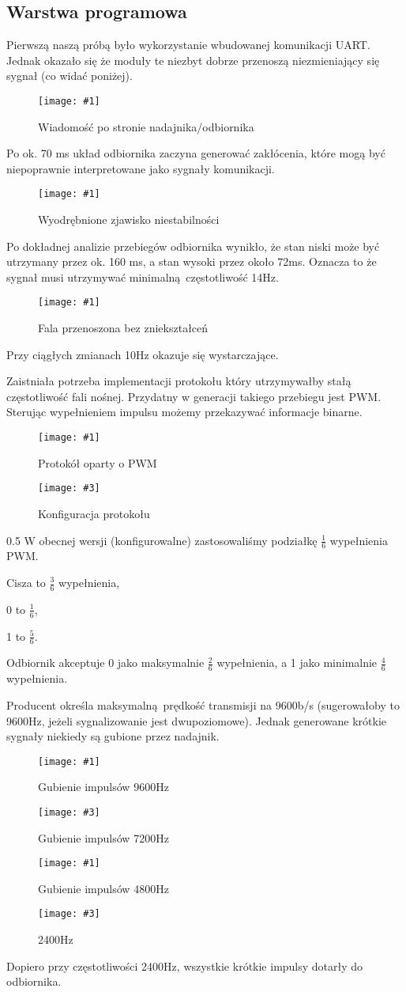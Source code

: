 \documentclass[12pt]{article}
\let\tempone\itemize
\let\temptwo\enditemize
\renewenvironment{itemize}{\tempone\setlength{\itemsep}{0cm}}{\temptwo}
\newcommand{\imgcustomsize}[3]{
	\begin{figure}[H]
		\centering
		\texttt{[image: \#1]}
		\caption{#2}
	\end{figure}
}
\newcommand{\img}[2]{\imgcustomsize{#1}{#2}{0.8}}
\newcommand{\imgsidebyside}[4]{
	\begin{figure}[H]
		\centering
		\begin{minipage}{.45\textwidth}
			\centering
			\texttt{[image: \#1]}
			\caption{#2}
		\end{minipage}%
		\hfill
		\begin{minipage}{.45\textwidth}
			\centering
			\texttt{[image: \#3]}
			\caption{#4}
		\end{minipage}
	\end{figure}
}
\begin{document}
		\subsection{Warstwa programowa}
			Pierwszą naszą próbą było wykorzystanie wbudowanej komunikacji UART. Jednak okazało się że moduły te niezbyt dobrze przenoszą niezmieniający się sygnał (co widać poniżej).

			\img{fail1}{Wiadomość po stronie nadajnika/odbiornika}
			Po ok. 70 ms układ odbiornika zaczyna generować zakłócenia, które mogą być niepoprawnie interpretowane jako sygnały komunikacji.

			\img{fail2}{Wyodrębnione zjawisko niestabilności}
			Po dokładnej analizie przebiegów odbiornika wynikło, że stan niski może być utrzymany przez ok. 160 ms, a stan wysoki przez około 72ms. Oznacza to że sygnał musi utrzymywać minimalną częstotliwość 14Hz.

			\img{fail3_good}{Fala przenoszona bez zniekształceń}
			Przy ciągłych zmianach 10Hz okazuje się wystarczające.

			Zaistniała potrzeba implementacji protokołu który utrzymywałby stałą częstotliwość fali nośnej. Przydatny w generacji takiego przebiegu jest PWM. Sterując wypełnieniem impulsu możemy przekazywać informacje binarne.
			\imgsidebyside{pgm/proto}{Protokół oparty o PWM}{pgm/proto_conf}{Konfiguracja protokołu}{0.5}
			W obecnej wersji (konfigurowalne) zastosowaliśmy podziałkę $\frac{1}{6}$ wypełnienia PWM.
			\begin{itemize}
				\item Cisza to  $\frac{3}{6}$ wypełnienia,
				\item 0 to  $\frac{1}{6}$,
				\item 1 to  $\frac{5}{6}$.
			\end{itemize}

			Odbiornik akceptuje 0 jako maksymalnie $\frac{2}{6}$ wypełnienia, a 1 jako minimalnie $\frac{4}{6}$ wypełnienia.

			Producent określa maksymalną prędkość transmisji na 9600b/s (sugerowałoby to 9600Hz, jeżeli sygnalizowanie jest dwupoziomowe). Jednak generowane krótkie sygnały niekiedy są gubione przez nadajnik.

			\imgsidebyside{bauds/9600}{Gubienie impulsów 9600Hz}{bauds/7200_2}{Gubienie impulsów 7200Hz}
			\imgsidebyside{bauds/4800_2}{Gubienie impulsów 4800Hz}{bauds/2400_2}{2400Hz}

			Dopiero przy częstotliwości 2400Hz, wszystkie krótkie impulsy dotarły do odbiornika.
\end{document}
